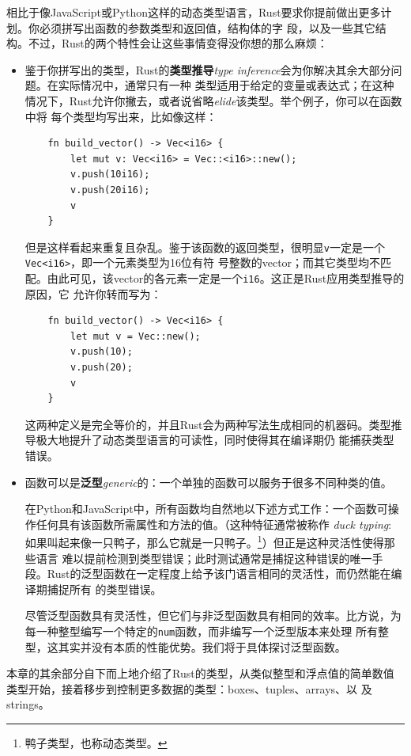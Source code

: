 \medskip
相比于像JavaScript或Python这样的动态类型语言，Rust要求你提前做出更多计划。你必须拼写出函数的参数类型和返回值，结构体的字
段，以及一些其它结构。不过，Rust的两个特性会让这些事情变得没你想的那么麻烦：
\begin{itemize}
\item 鉴于你拼写出的类型，Rust的\textbf{类型推导}\textit{type inference}会为你解决其余大部分问题。在实际情况中，通常只有一种
类型适用于给定的变量或表达式；在这种情况下，Rust允许你撇去，或者说省略\textit{elide}该类型。举个例子，你可以在函数中将
每个类型均写出来，比如像这样：
\begin{verbatim}
    fn build_vector() -> Vec<i16> {
        let mut v: Vec<i16> = Vec::<i16>::new();
        v.push(10i16);
        v.push(20i16);
        v
    }
\end{verbatim}

\smallskip
但是这样看起来重复且杂乱。鉴于该函数的返回类型，很明显\texttt{v}一定是一个\texttt{Vec<i16>}，即一个元素类型为16位有符
号整数的vector；而其它类型均不匹配。由此可见，该vector的各元素一定是一个\texttt{i16}。这正是Rust应用类型推导的原因，它
允许你转而写为：
\begin{verbatim}
    fn build_vector() -> Vec<i16> {
        let mut v = Vec::new();
        v.push(10);
        v.push(20);
        v
    }
\end{verbatim}

\smallskip
这两种定义是完全等价的，并且Rust会为两种写法生成相同的机器码。类型推导极大地提升了动态类型语言的可读性，同时使得其在编译期仍
能捕获类型错误。

\item 函数可以是\textbf{泛型}\textit{generic}的：一个单独的函数可以服务于很多不同种类的值。

\medskip
在Python和JavaScript中，所有函数均自然地以下述方式工作：一个函数可操作任何具有该函数所需属性和方法的值。（这种特征通常被称作
\textit{duck typing}: 如果叫起来像一只鸭子，那么它就是一只鸭子。\footnote{鸭子类型，也称动态类型。}）但正是这种灵活性使得那些语言
难以提前检测到类型错误；此时测试通常是捕捉这种错误的唯一手段。Rust的泛型函数在一定程度上给予该门语言相同的灵活性，而仍然能在编译期捕捉所有
的类型错误。

\medskip
尽管泛型函数具有灵活性，但它们与非泛型函数具有相同的效率。比方说，为每一种整型编写一个特定的\texttt{num}函数，而非编写一个泛型版本来处理
所有整型，这其实并没有本质的性能优势。我们将于具体探讨泛型函数。
\end{itemize}

本章的其余部分自下而上地介绍了Rust的类型，从类似整型和浮点值的简单数值类型开始，接着移步到控制更多数据的类型：boxes、tuples、arrays、以
及strings。

